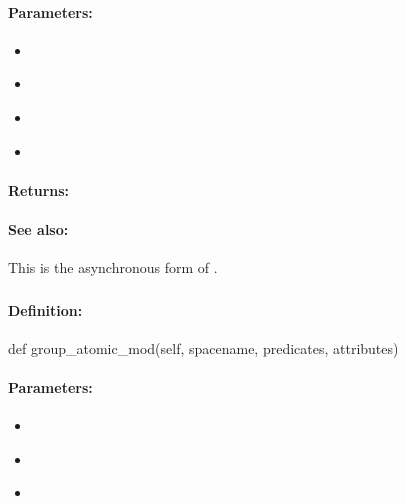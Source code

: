 \paragraph{Parameters:}
\begin{itemize}[noitemsep]
\item {}\\

\item {}\\

\item {}\\

\item {}\\

\end{itemize}

\paragraph{Returns:}


\paragraph{See also:}  This is the asynchronous form of .

\pagebreak
\subsubsection{}
\label{api:python:group_atomic_mod}


\paragraph{Definition:}
\begin{pythoncode}
def group_atomic_mod(self, spacename, predicates, attributes)
\end{pythoncode}

\paragraph{Parameters:}
\begin{itemize}[noitemsep]
\item {}\\

\item {}\\

\item {}\\

\end{itemize}

